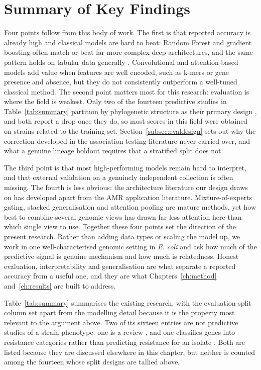 \section{Summary of Key Findings}

Four points follow from this body of work. The first is that reported accuracy is already high and classical models are hard to beat: Random Forest and gradient boosting often match or beat far more complex deep architectures, and the same pattern holds on tabular data generally \cite{grinsztajn2022trees, shwartzziv2022tabular}. Convolutional and attention-based models add value when features are well encoded, such as k-mers or gene presence and absence, but they do not consistently outperform a well-tuned classical method. The second point matters most for this research: evaluation is where the field is weakest. Only two of the fourteen predictive studies in Table~\ref{tab:summary} partition by phylogenetic structure as their primary design \cite{Yu2025, Hu2024}, and both report a drop once they do, so most scores in this field were obtained on strains related to the training set. Section~\ref{subsec:evaldesign} sets out why the correction developed in the association-testing literature \cite{saber2020bacgwas, lees2020pyseer} never carried over, and what a genuine lineage holdout requires that a stratified split does not.

The third point is that most high-performing models remain hard to interpret, and that external validation on a genuinely independent collection is often missing. The fourth is less obvious: the architecture literature our design draws on has developed apart from the AMR application literature. Mixture-of-experts gating, stacked generalisation and attention pooling are mature methods, yet how best to combine several genomic views has drawn far less attention here than which single view to use. Together these four points set the direction of the present research. Rather than adding data types or scaling the model up, we work in one well-characterised genomic setting in \textit{E. coli} and ask how much of the predictive signal is genuine mechanism and how much is relatedness. Honest evaluation, interpretability and generalisation are what separate a reported accuracy from a useful one, and they are what Chapters~\ref{ch:method} and~\ref{ch:results} are built to address.

Table~\ref{tab:summary} summarises the existing research, with the evaluation-split column set apart from the modelling detail because it is the property most relevant to the argument above. Two of its sixteen entries are not predictive studies of a strain phenotype: one is a review \cite{Yun2024}, and one classifies genes into resistance categories rather than predicting resistance for an isolate \cite{ArangoArgoty2018}. Both are listed because they are discussed elsewhere in this chapter, but neither is counted among the fourteen whose split designs are tallied above.

